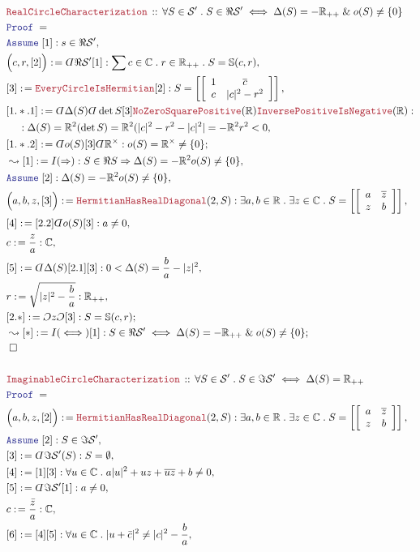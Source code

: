 \documentclass[12pt]{scrartcl}
\newcommand{\LOGIC}[1]{\textcolor{Blue}{\mathtt{#1}}}
\newcommand{\THM}[1]{\textcolor{Maroon}{\mathtt{#1}}}
\renewcommand{\.}{\; . \;}
\newcommand{\de}{: \kern 0.1pc =}
\newcommand{\Theorem}[2]{& \THM{#1} \, :: \, #2 \\ & \Proof = \\ }
\newcommand{\NewLine}{\\ & \kern 1pc}
\newcommand{\Page}[1]{ \begin{align*} #1 \end{align*}   }
\newcommand{ \bd }{ \ByDef }
\renewcommand{\And}{\; \& \;}
\newcommand{\Imply}{\Rightarrow}
\newcommand{\Reals}{\mathbb{R} }
\newcommand{\Complex}{\mathbb{C}}
\newcommand{\Sphere}{\mathbb{S}}
\newcommand{\Say}[3]{& #1 \de #2 : #3, \\}
\newcommand{\Conclude}[3]{& #1 \de #2 : #3; \\}
\newcommand{\Derive}[3]{& \leadsto #1 \de #2 : #3, \\}
\newcommand{\DeriveConclude}[3]{& \leadsto #1 \de #2 : #3 ; \\}
\newcommand{\Assume}[2]{& \LOGIC{Assume} \; #1 : #2, \\}
\newcommand{\QED}{\; \square}
\newcommand{\EndProof}{& \QED \\}
\newcommand{\ByDef}{\rotatebox[origin=c]{-180}{$D$}}%
\newcommand{\ByConstr}{\rotatebox[origin=c]{-180}{$C$}}%
\newcommand{\Proof}{\LOGIC{Proof} \; }
\renewcommand{\S}{\mathcal{S}}
\begin{document}
\Page{
	\Theorem{RealCircleCharacterization}
	{
		\forall S \in \S' \.  S \in \Re \S' \iff   \Delta(S) = -\Reals_{++} \And o(S) \neq \{0\}
	}
	\Assume{[1]}{ s \in \Re \S'}
	\Say{\Big( c, r,[2]\Big)}{\bd \Re \S' [1]}
	{
		\sum c \in \Complex \. r \in \Reals_{++} \. S = \Sphere(c,r)
	}
	\Say{[3]}{\THM{EveryCircleIsHermitian}[2] }
	{
		S = \left[ \left[      
		\begin{array}{cc}
			1 & \overline{c} \\
			c &     |c|^2 - r^2
		\end{array}
		\right] \right]
	}
	\Say{[1.*.1]}{\bd \Delta(S) \bd \det S [3] \THM{NoZeroSquarePositive}(\Reals) \THM{InversePositiveIsNegative}(\Reals)}
	{
		\NewLine :
		\Delta(S) = \Reals^2 (\det S)   =  \Reals^2 (  |c|^2 - r^2 - |c|^2| =  - \Reals^2 r^2 < 0 
	}
	\Conclude{[1.*.2]}{\bd o(S) [3]  \bd \Reals^\times} {o(S) = \Reals^\times \neq \{0\} }
	\Derive{[1]}{I(\Imply)}{S \in \Re S \Imply \Delta(S) = -\Reals^2   o(S) \neq \{0\}}
	\Assume{[2]}{\Delta(S) = -\Reals^2   o(S) \neq \{0\}}
	\Say{\Big( a,b,z, [3] \Big)}{\THM{HermitianHasRealDiagonal}(2,S)}
	{
		\exists a,b \in \Reals \.
		\exists z \in \Complex \.
		S = \left[ \left[      
		\begin{array}{cc}
			a & \overline{z} \\
			z &     b
		\end{array}
		\right] \right]
	}
	\Say{[4]}{[2.2]\bd o(S) [3]}{a \neq 0}
	\Say{c}{\frac{z}{a}}{\Complex}
	\Say{[5]}{\bd \Delta(S)[2.1][3]}
	{
		0  <  \Delta(S) = \frac{b}{a} - |z|^2
	}
	\Say{r}{\sqrt{|z|^2 - \frac{b}{a}}}{\Reals_{++}}
	\Conclude{[2.*]}{\ByConstr z \ByConstr [3]}{ S = \Sphere(c,r)}
	\DeriveConclude{[*]}{I(\iff)[1]}{ S \in \Re \S' \iff   \Delta(S) = -\Reals_{++} \And o(S) \neq \{0\} }
	\EndProof 
	\\
	\Theorem{ImaginableCircleCharacterization}
	{
		\forall S \in \S' \.  S \in \Im \S' \iff   \Delta(S) = \Reals_{++} 
	}
	\Say{\Big( a,b,z, [2] \Big)}{\THM{HermitianHasRealDiagonal}(2,S)}
	{
		\exists a,b \in \Reals \.
		\exists z \in \Complex \.
		S = \left[ \left[      
		\begin{array}{cc}
			a & \overline{z} \\
			z &     b
		\end{array}
		\right] \right]
	}
	\Assume{[2]}{S \in \Im \S'}
	\Say{[3]}{\bd \Im \S' (S)}{  S = \emptyset  }
	\Say{[4]}{[1][3]}{\forall u \in \Complex  \.   a|u|^2  + u z + \overline{ uz} + b \neq 0 }	
	\Say{[5]}{\bd \Im \S' [1]}{ a \neq 0}
	\Say{c}{\frac{\bar z}{a}}{\Complex}
	\Say{[6]}{[4][5]}{ \forall u \in \Complex \. | u + \bar c|^2  \neq  |c|^2 - \frac{b}{a}}
}
\end{document}
